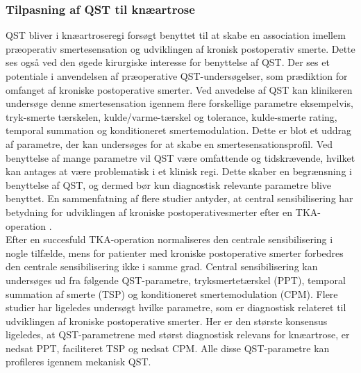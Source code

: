 \subsubsection{Tilpasning af QST til knæartrose}
QST bliver i knæartroseregi forsøgt benyttet til at skabe en association imellem præoperativ smertesensation og udviklingen af kronisk postoperativ smerte. Dette ses også ved den øgede kirurgiske interesse for benyttelse af QST. Der ses et potentiale i anvendelsen af præoperative QST-undersøgelser, som prædiktion for omfanget af kroniske postoperative smerter. \citep{Wylde2013} Ved anvedelse af QST kan klinikeren undersøge denne smertesensation igennem flere forskellige parametre eksempelvis, tryk-smerte tærskelen, kulde/varme-tærskel og tolerance, kulde-smerte rating, temporal summation og konditioneret smertemodulation. \citep{Cornelius2015} Dette er blot et uddrag af parametre, der kan undersøges for at skabe en smertesensationsprofil. Ved benyttelse af mange parametre vil QST være omfattende og tidskrævende, hvilket kan antages at være problematisk i et klinisk regi. Dette skaber en begrænsning i benyttelse af QST, og dermed bør kun diagnostisk relevante parametre blive benyttet. \citep{Nielsen2009} En sammenfatning af flere studier antyder, at central sensibilisering har betydning for udviklingen af kroniske postoperativesmerter efter en TKA-operation \citep{Suokas2012}.  \\
Efter en succesfuld TKA-operation normaliseres den centrale sensibilisering i nogle tilfælde, mens for patienter med kroniske postoperative smerter forbedres den centrale sensibilisering ikke i samme grad. Central sensibilisering kan undersøges ud fra følgende QST-parametre, tryksmertetærskel (PPT), temporal summation af smerte (TSP) og konditioneret smertemodulation (CPM). \citep{Arendt-Nielsen2015b} Flere studier har ligeledes undersøgt hvilke parametre, som er diagnostisk relateret til udviklingen af kroniske postoperative smerter. Her er den største konsensus ligeledes, at QST-parametrene med størst diagnostisk relevans for knæartrose, er nedsat PPT, faciliteret TSP og nedsat CPM. Alle disse QST-parametre kan profileres igennem mekanisk QST. \citep{Petersen2015} \citep{Petersen2016} \citep{Wylde2015b} \\
